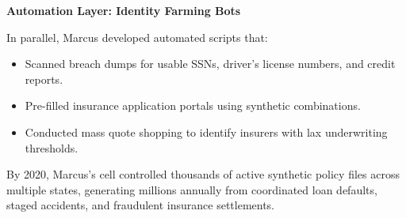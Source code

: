 \medskip

\textbf{Automation Layer: Identity Farming Bots}

In parallel, Marcus developed automated scripts that:

\begin{itemize}
  \item Scanned breach dumps for usable SSNs, driver's license numbers, and credit reports.
  \item Pre-filled insurance application portals using synthetic combinations.
  \item Conducted mass quote shopping to identify insurers with lax underwriting thresholds.
\end{itemize}

By 2020, Marcus’s cell controlled thousands of active synthetic policy files across multiple states, generating millions annually from coordinated loan defaults, staged accidents, and fraudulent insurance settlements.

